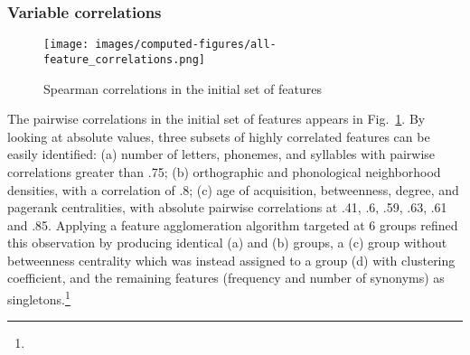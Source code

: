 \subsubsection{Variable correlations}


\begin{figure}[!th]
    \centering
    \texttt{[image: images/computed-figures/all-feature\_correlations.png]}
    \caption{Spearman correlations in the initial set of features}
    \label{fig:feature-corrs-initial}
\end{figure}

\begin{new}

The pairwise correlations in the initial set of features appears in Fig.~\ref{fig:feature-corrs-initial}.
By looking at absolute values, three subsets of highly correlated features can be easily identified:
(a) number of letters, phonemes, and syllables with pairwise correlations greater than .75;
(b) orthographic and phonological neighborhood densities, with a correlation of .8;
(c) age of acquisition, betweenness, degree, and pagerank centralities, with absolute pairwise correlations at .41, .6, .59, .63, .61 and .85.
Applying a feature agglomeration algorithm targeted at 6 groups refined this observation by producing identical (a) and (b) groups, a (c) group without betweenness centrality which was instead assigned to a group (d) with clustering coefficient, and the remaining features (frequency and number of synonyms) as singletons.\footnote{
}
\end{new}

